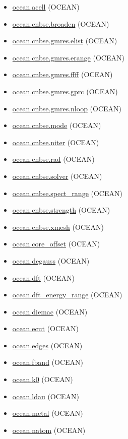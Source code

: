 \documentclass[11pt]{article}
\begin{document}
\begin{itemize}
\item \hyperref[kw:ocean-acell]{ocean.acell} (OCEAN)
\item \hyperref[kw:ocean-cnbse-broaden]{ocean.cnbse.broaden} (OCEAN)
\item \hyperref[kw:ocean-cnbse-gmres-elist]{ocean.cnbse.gmres.elist} (OCEAN)
\item \hyperref[kw:ocean-cnbse-gmres-erange]{ocean.cnbse.gmres.erange} (OCEAN)
\item \hyperref[kw:ocean-cnbse-gmres-ffff]{ocean.cnbse.gmres.ffff} (OCEAN)
\item \hyperref[kw:ocean-cnbse-gmres-gprc]{ocean.cnbse.gmres.gprc} (OCEAN)
\item \hyperref[kw:ocean-cnbse-gmres-nloop]{ocean.cnbse.gmres.nloop} (OCEAN)
\item \hyperref[kw:ocean-cnbse-mode]{ocean.cnbse.mode} (OCEAN)
\item \hyperref[kw:ocean-cnbse-niter]{ocean.cnbse.niter} (OCEAN)
\item \hyperref[kw:ocean-cnbse-rad]{ocean.cnbse.rad} (OCEAN)
\item \hyperref[kw:ocean-cnbse-solver]{ocean.cnbse.solver} (OCEAN)
\item \hyperref[kw:ocean-cnbse-spect-range]{ocean.cnbse.spect\_range} (OCEAN)
\item \hyperref[kw:ocean-cnbse-strength]{ocean.cnbse.strength} (OCEAN)
\item \hyperref[kw:ocean-cnbse-xmesh]{ocean.cnbse.xmesh} (OCEAN)
\item \hyperref[kw:ocean-core-offset]{ocean.core\_offset} (OCEAN)
\item \hyperref[kw:ocean-degauss]{ocean.degauss} (OCEAN)
\item \hyperref[kw:ocean-dft]{ocean.dft} (OCEAN)
\item \hyperref[kw:ocean-dft-energy-range]{ocean.dft\_energy\_range} (OCEAN)
\item \hyperref[kw:ocean-diemac]{ocean.diemac} (OCEAN)
\item \hyperref[kw:ocean-ecut]{ocean.ecut} (OCEAN)
\item \hyperref[kw:ocean-edges]{ocean.edges} (OCEAN)
\item \hyperref[kw:ocean-fband]{ocean.fband} (OCEAN)
\item \hyperref[kw:ocean-k0]{ocean.k0} (OCEAN)
\item \hyperref[kw:ocean-ldau]{ocean.ldau} (OCEAN)
\item \hyperref[kw:ocean-metal]{ocean.metal} (OCEAN)
\item \hyperref[kw:ocean-natom]{ocean.natom} (OCEAN)

\end{itemize}
\end{document}
